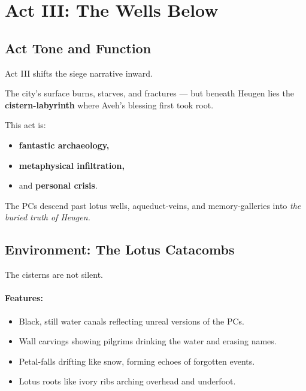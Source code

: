 \documentclass[11pt]{article}
\begin{document}
\newpage

\section{Act III: The Wells Below}
\label{sec:act3}

\subsection*{Act Tone and Function}

Act III shifts the siege narrative inward.

The city's surface burns, starves, and fractures --- but beneath Heugen lies the
\textbf{cistern-labyrinth} where Aveh's blessing first took root.

This act is:
\begin{itemize}[leftmargin=*]
  \item \textbf{fantastic archaeology,}
  \item \textbf{metaphysical infiltration,}
  \item and \textbf{personal crisis}.
\end{itemize}

The PCs descend past lotus wells, aqueduct-veins, and memory-galleries into
\emph{the buried truth of Heugen.}

\bigskip

\subsection*{Environment: The Lotus Catacombs}

The cisterns are not silent.

\paragraph{Features:}
\begin{itemize}[leftmargin=*]
  \item Black, still water canals reflecting unreal versions of the PCs.
  \item Wall carvings showing pilgrims drinking the water and erasing names.
  \item Petal-falls drifting like snow, forming echoes of forgotten events.
  \item Lotus roots like ivory ribs arching overhead and underfoot.
\end{itemize}
\end{document}

